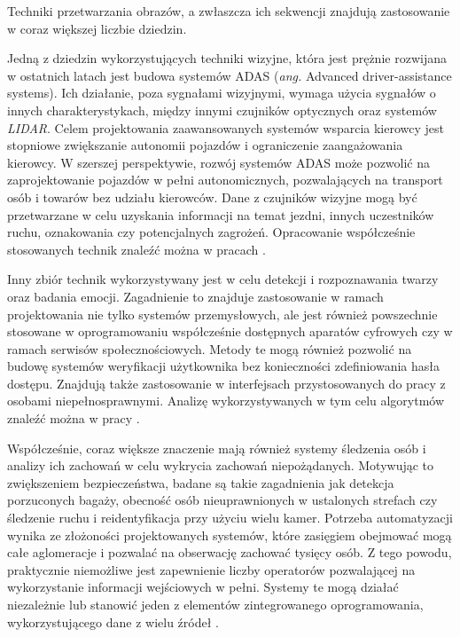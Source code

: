 Techniki przetwarzania obrazów, a zwłaszcza ich sekwencji znajdują zastosowanie w coraz większej liczbie dziedzin. %

Jedną z dziedzin wykorzystujących techniki wizyjne, która jest prężnie rozwijana w ostatnich latach jest budowa systemów ADAS (\emph{ang.} Advanced driver-assistance systems). %
Ich działanie, poza sygnałami wizyjnymi, wymaga użycia sygnałów o innych charakterystykach, między innymi czujników optycznych oraz systemów \emph{LIDAR}.
Celem projektowania zaawansowanych systemów wsparcia kierowcy jest stopniowe zwiększanie autonomii pojazdów i ograniczenie zaangażowania kierowcy. W szerszej perspektywie, rozwój systemów ADAS może pozwolić na zaprojektowanie pojazdów w pełni autonomicznych, pozwalających na transport osób i towarów bez udziału kierowców.
Dane z czujników wizyjne mogą być przetwarzane w celu uzyskania informacji na temat jezdni, innych uczestników ruchu, oznakowania czy potencjalnych zagrożeń. 
Opracowanie współcześnie stosowanych technik znaleźć można w pracach \cite{Bengler2014,Velez2017}.

Inny zbiór technik wykorzystywany jest w celu detekcji i rozpoznawania twarzy oraz badania emocji. %
Zagadnienie to znajduje zastosowanie w ramach projektowania nie tylko systemów przemysłowych, ale jest również powszechnie stosowane w oprogramowaniu współcześnie dostępnych aparatów cyfrowych czy w ramach serwisów społecznościowych. Metody te mogą również pozwolić na budowę systemów weryfikacji użytkownika bez konieczności zdefiniowania hasła dostępu. Znajdują także zastosowanie w interfejsach przystosowanych do pracy z osobami niepełnosprawnymi.
Analizę wykorzystywanych w tym celu algorytmów znaleźć można w pracy \cite{Anil2016}.

Współcześnie, coraz większe znaczenie mają również systemy śledzenia osób i analizy ich zachowań w celu wykrycia zachowań niepożądanych. %
Motywując to zwiększeniem bezpieczeństwa, badane są takie zagadnienia jak detekcja porzuconych bagaży, obecność osób nieuprawnionych w ustalonych strefach czy śledzenie ruchu i reidentyfikacja przy użyciu wielu kamer. %
Potrzeba automatyzacji wynika ze złożoności projektowanych systemów, które zasięgiem obejmować mogą całe aglomeracje i pozwalać na obserwację zachować tysięcy osób. Z tego powodu, praktycznie niemożliwe jest zapewnienie liczby operatorów pozwalającej na wykorzystanie informacji wejściowych w pełni.
Systemy te mogą działać niezależnie lub stanowić jeden z elementów zintegrowanego oprogramowania, wykorzystującego dane z wielu źródeł \cite{Sriram2016,Hussain2016,Gouo2015}.


